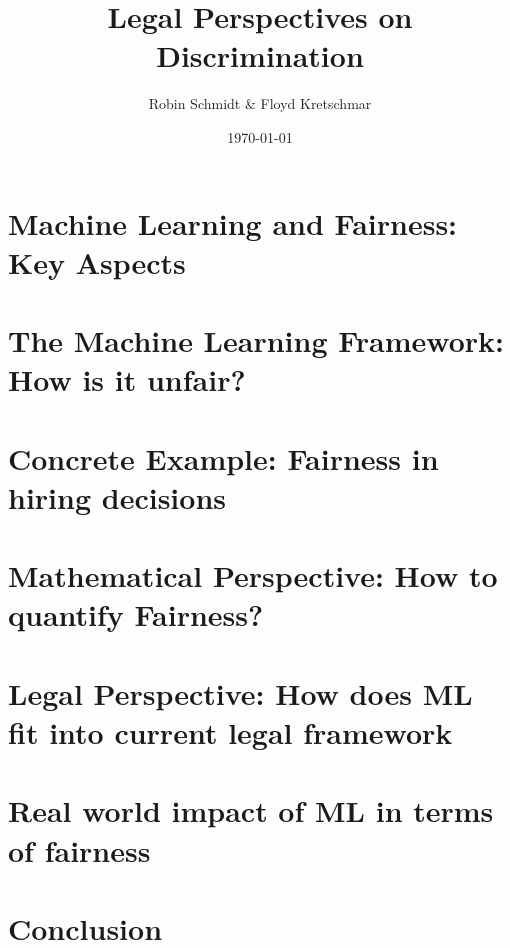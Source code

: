 \documentclass[9pt, t, aspectratio=169]{beamer}
\title{Legal Perspectives on Discrimination}
\subtitle{Robin Schmidt \& Floyd Kretschmar}
\institute{\texttt{[image: assets/uni\_logo\_dark.png]}}
\date{\today}
\begin{document}
\titlepage

\section{Machine Learning and Fairness: Key Aspects}

\section{The Machine Learning Framework: How is it unfair?}


\section{Concrete Example: Fairness in hiring decisions}


\section{Mathematical Perspective: How to quantify Fairness?}

\section{Legal Perspective: How does ML fit into current legal framework}

\section{Real world impact of ML in terms of fairness}

\section{Conclusion}

\end{document}

